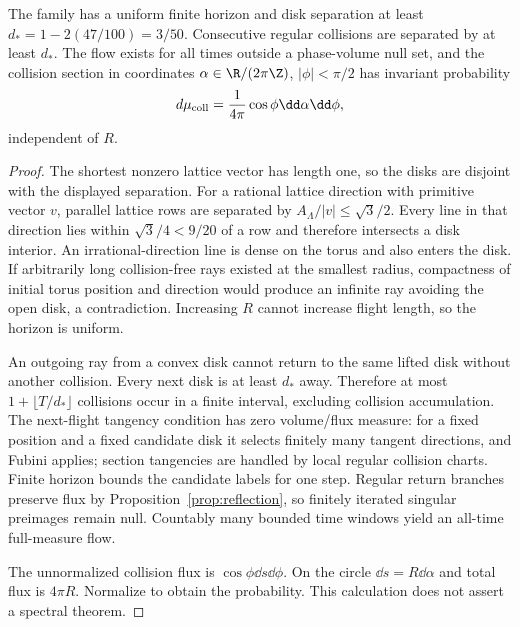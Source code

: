\begin{proposition}\label{prop:lorentz-geometry}
The family has a uniform finite horizon and disk separation at least
$d_*=1-2(47/100)=3/50$. Consecutive regular collisions are separated by at least $d_*$. The flow exists for all times outside a phase-volume null set, and the collision section in coordinates $\alpha\in\R/(2\pi\Z)$, $|\phi|<\pi/2$ has invariant probability
\[
 d\mu_{\rm coll}=\frac1{4\pi}\cos\phi\dd\alpha\dd\phi,
\]
independent of $R$.
\end{proposition}
\begin{proof}
The shortest nonzero lattice vector has length one, so the disks are disjoint with the displayed separation. For a rational lattice direction with primitive vector $v$, parallel lattice rows are separated by $A_\Lambda/|v|\le\sqrt3/2$. Every line in that direction lies within $\sqrt3/4<9/20$ of a row and therefore intersects a disk interior. An irrational-direction line is dense on the torus and also enters the disk. If arbitrarily long collision-free rays existed at the smallest radius, compactness of initial torus position and direction would produce an infinite ray avoiding the open disk, a contradiction. Increasing $R$ cannot increase flight length, so the horizon is uniform.

An outgoing ray from a convex disk cannot return to the same lifted disk without another collision. Every next disk is at least $d_*$ away. Therefore at most $1+\lfloor T/d_*\rfloor$ collisions occur in a finite interval, excluding collision accumulation. The next-flight tangency condition has zero volume/flux measure: for a fixed position and a fixed candidate disk it selects finitely many tangent directions, and Fubini applies; section tangencies are handled by local regular collision charts. Finite horizon bounds the candidate labels for one step. Regular return branches preserve flux by Proposition~\ref{prop:reflection}, so finitely iterated singular preimages remain null. Countably many bounded time windows yield an all-time full-measure flow.

The unnormalized collision flux is $\cos\phi\dd s\dd\phi$. On the circle $\dd s=R\dd\alpha$ and total flux is $4\pi R$. Normalize to obtain the probability. This calculation does not assert a spectral theorem.
\end{proof}


